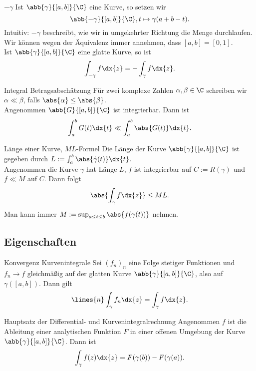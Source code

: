 \begin{karte}{\(-\gamma\)}
    Ist \(\abb{\gamma}{[a,b]}{\C}\) eine Kurve, so setzen wir 
    \[ \abb{-\gamma}{[a,b]}{\C}, t\mapsto \gamma(a+b-t). \]
    Intuitiv: \(-\gamma\) beschreibt, wie wir in umgekehrter Richtung die Menge durchlaufen.\\
    Wir können wegen der Äquivalenz immer annehmen, dass \([a,b] = [0,1]\).\\
    Ist \(\abb{\gamma}{[a,b]}{\C}\) eine glatte Kurve, so ist 
    \[ \int_{-\gamma} f \dx{z} = -\int_\gamma f \dx{z}. \]
\end{karte}

\begin{karte}{Integral Betragsabschätzung}
    Für zwei komplexe Zahlen \(\alpha, \beta \in\C\) schreiben wir \(\alpha \ll \beta \), 
    falls \(\abs{\alpha} \leq \abs{\beta}\). \\
    Angenommen \(\abb{G}{[a,b]}{\C}\) ist integrierbar. Dann ist 
    \[ \int_a^b G(t) \dx{t} \ll \int_a^b \abs{G(t)} \dx{t}. \]
\end{karte}

\begin{karte}{Länge einer Kurve, \(ML\)-Formel}
    Die Länge der Kurve \(\abb{\gamma}{[a,b]}{\C}\) ist gegeben durch \( L := \int_a^b \abs{\dot{\gamma}(t)}\dx{t} \).\\
    Angenommen die Kurve \(\gamma\) hat Länge \(L\), \(f\) ist integrierbar auf \(C := R(\gamma)\) und 
    \(f \ll M\) auf \(C\). Dann folgt 
    \[ \abs{ \int_\gamma f \dx{z} } \leq ML. \]
    Man kann immer \(M := \sup_{a\leq t\leq b} \abs{f(\gamma(t))}\) nehmen.
\end{karte}

\subsection{Eigenschaften}

\begin{karte}{Konvergenz Kurvenintegrale}
    Sei \((f_n)_n\) eine Folge stetiger Funktionen und \(f_n \rightarrow f\) gleichmäßig auf der 
    glatten Kurve \(\abb{\gamma}{[a,b]}{\C}\), also auf \(\gamma([a,b])\). Dann gilt 
    \[ \limes{n} \int_\gamma f_n \dx{z} = \int_\gamma f \dx{z}. \]
\end{karte}

\begin{karte}{Hauptsatz der Differential- und Kurvenintegralrechnung}
    Angenommen \(f\) ist die Ableitung einer analytischen Funktion \(F\) in einer offenen 
    Umgebung der Kurve \(\abb{\gamma}{[a,b]}{\C}\). Dann ist 
    \[ \int_\gamma f(z) \dx{z} = F(\gamma(b)) - F(\gamma(a)). \]
\end{karte}